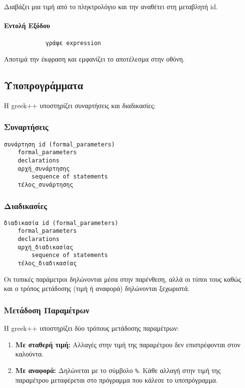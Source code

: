 \documentclass[12pt,a4paper]{article}
\begin{document}
    Διαβάζει μια τιμή από το πληκτρολόγιο και την αναθέτει στη μεταβλητή id.

    \paragraph{Εντολή Εξόδου}
        \begin{verbatim}
            γράψε expression
        \end{verbatim}

        Αποτιμά την έκφραση και εμφανίζει το αποτέλεσμα στην οθόνη.

    \subsection{Υποπρογράμματα}
Η greek++ υποστηρίζει συναρτήσεις και διαδικασίες:

\subsubsection{Συναρτήσεις}
\begin{verbatim}
συνάρτηση id (formal_parameters)
    formal_parameters
    declarations
    αρχή_συνάρτησης
        sequence of statements
    τέλος_συνάρτησης
\end{verbatim}

\subsubsection{Διαδικασίες}
\begin{verbatim}
διαδικασία id (formal_parameters)
    formal_parameters
    declarations
    αρχή_διαδικασίας
        sequence of statements
    τέλος_διαδικασίας
\end{verbatim}

Οι τυπικές παράμετροι δηλώνονται μέσα στην παρένθεση, αλλά οι τύποι τους καθώς και ο τρόπος μετάδοσης (τιμή ή αναφορά) δηλώνονται ξεχωριστά.

\subsubsection{Μετάδοση Παραμέτρων}
Η greek++ υποστηρίζει δύο τρόπους μετάδοσης παραμέτρων:
\begin{enumerate}
    \item \textbf{Με σταθερή τιμή:} Αλλαγές στην τιμή της παραμέτρου δεν επιστρέφονται στον καλούντα.
    \item \textbf{Με αναφορά:} Δηλώνεται με το σύμβολο \texttt{\%}. Κάθε αλλαγή στην τιμή της παραμέτρου μεταφέρεται στο πρόγραμμα που κάλεσε το υποπρόγραμμα.
\end{enumerate}
\end{document}
